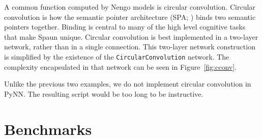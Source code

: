 \documentclass{frontiersSCNS}
\begin{document}
A common function computed by Nengo models
is circular convolution.
Circular convolution is how
the semantic pointer architecture
(SPA; \cite{TODO})
binds two semantic pointers together.
Binding is central to many
of the high level cognitive tasks
that make Spaun unique.
Circular convolution
is best implemented in a two-layer network,
rather than in a single connection.
This two-layer network construction is simplified
by the existence of the \texttt{CircularConvolution} network.
The complexity encapsulated in that network
can be seen in Figure~\ref{fig:cconv}.

Unlike the previous two examples,
we do not implement
circular convolution in PyNN.
The resulting script would be
too long to be instructive.

\section{Benchmarks}
\end{document}
